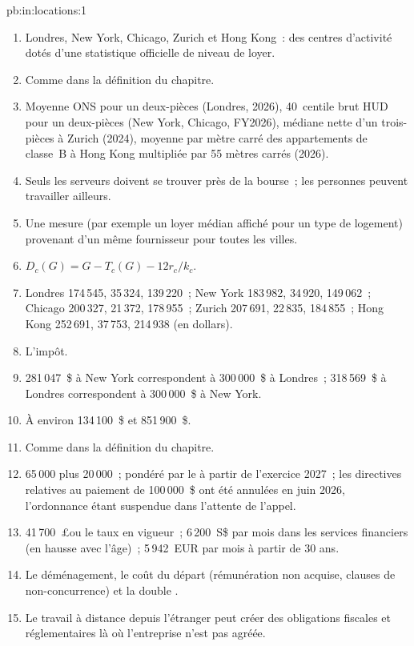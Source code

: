 \begin{solution}{pb:in:locations:1}
\begin{enumerate}
\item Londres, New York, Chicago, Zurich et Hong Kong~: des centres d'activité dotés d'une statistique officielle de niveau de loyer.
\item Comme dans la définition du chapitre.
\item Moyenne ONS pour un deux-pièces (Londres, 2026), 40~centile brut HUD pour un deux-pièces (New York, Chicago, FY2026), médiane nette
d'un trois-pièces à Zurich (2024), moyenne par mètre carré des appartements de classe~B à Hong Kong multipliée par 55 mètres carrés (2026).
\item Seuls les serveurs doivent se trouver près de la bourse~; les personnes peuvent travailler ailleurs.
\item Une mesure (par exemple un loyer médian affiché pour un type de logement) provenant d'un même fournisseur pour toutes les villes.
\item $D_c(G)=G-T_c(G)-12r_c/k_c$.
\item Londres 174\,545, 35\,324, 139\,220~; New York 183\,982, 34\,920, 149\,062~; Chicago 200\,327, 21\,372, 178\,955~;
Zurich 207\,691, 22\,835, 184\,855~; Hong Kong 252\,691, 37\,753, 214\,938 (en dollars).
\item L'impôt.
\item 281\,047~\$ à New York correspondent à 300\,000~\$ à Londres~; 318\,569~\$ à Londres correspondent à 300\,000~\$ à New York.
\item À environ 134\,100~\$ et 851\,900~\$.
\item Comme dans la définition du chapitre.
\item 65\,000 plus 20\,000~; pondéré par le  à partir de l'exercice 2027~; les directives relatives au paiement de 100\,000~\$ ont été
annulées en juin 2026, l'ordonnance étant suspendue dans l'attente de l'appel.
\item 41\,700~\pounds ou le taux en vigueur~; 6\,200~S\$ par mois dans les services financiers (en hausse avec l'âge)~; 5\,942~EUR par mois
à partir de 30 ans.
\item Le déménagement, le coût du départ (rémunération non acquise, clauses de non-concurrence) et la double .
\item Le travail à distance depuis l'étranger peut créer des obligations fiscales et réglementaires là où l'entreprise n'est pas agréée.

\end{enumerate}
\end{solution}
